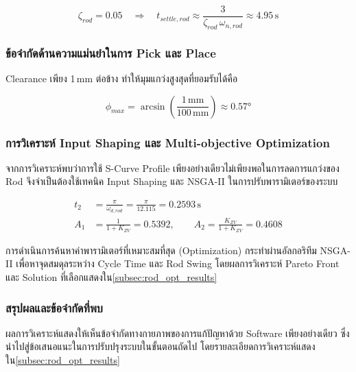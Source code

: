 \begin{equation}
  \zeta_{rod} = 0.05 \quad \Rightarrow \quad
  t_{settle,rod} \approx \frac{3}{\zeta_{rod}\,\omega_{n,rod}} \approx 4.95\,\text{s}
  \label{eq:rod_settle}
\end{equation}

\subsubsection{ข้อจำกัดด้านความแม่นยำในการ Pick และ Place}
\label{subsubsec:precision_constraints}

Clearance เพียง 1\,mm ต่อข้าง ทำให้มุมแกว่งสูงสุดที่ยอมรับได้คือ

\begin{equation}
  \phi_{max} = \arcsin\!\left(\frac{1\,\text{mm}}{100\,\text{mm}}\right) \approx 0.57°
  \label{eq:phi_max}
\end{equation}

\subsubsection{การวิเคราะห์ Input Shaping และ Multi-objective Optimization}
\label{subsubsec:input_shaping_optimization}

จากการวิเคราะห์พบว่าการใช้ S-Curve Profile เพียงอย่างเดียวไม่เพียงพอในการลดการแกว่งของ Rod จึงจำเป็นต้องใช้เทคนิค Input Shaping และ NSGA-II ในการปรับพารามิเตอร์ของระบบ

\begin{equation}
  \begin{split}
    t_2 &= \frac{\pi}{\omega_{d,rod}} = \frac{\pi}{12.115} = 0.2593\,\text{s} \\
    A_1 &= \frac{1}{1+K_{ZV}} = 0.5392, \qquad
    A_2  = \frac{K_{ZV}}{1+K_{ZV}} = 0.4608
  \end{split}
  \label{eq:zv_params}
\end{equation}

การดำเนินการค้นหาค่าพารามิเตอร์ที่เหมาะสมที่สุด (Optimization) กระทำผ่านอัลกอริทึม NSGA-II เพื่อหาจุดสมดุลระหว่าง Cycle Time และ Rod Swing โดยผลการวิเคราะห์ Pareto Front และ Solution ที่เลือกแสดงใน\cref{subsec:rod_opt_results}

\subsubsection{สรุปผลและข้อจำกัดที่พบ}
\label{subsubsec:results_and_limitations}

ผลการวิเคราะห์แสดงให้เห็นข้อจำกัดทางกายภาพของการแก้ปัญหาด้วย Software เพียงอย่างเดียว ซึ่งนำไปสู่ข้อเสนอแนะในการปรับปรุงระบบในขั้นตอนถัดไป โดยรายละเอียดการวิเคราะห์แสดงใน\cref{subsec:rod_opt_results}
